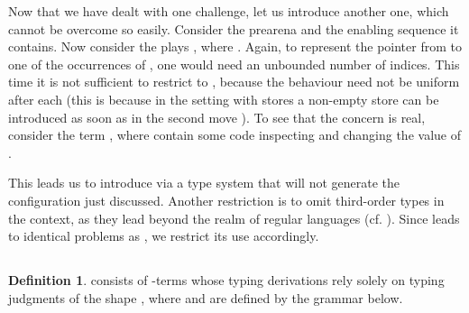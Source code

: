 \documentclass{CSML}
\theoremstyle{definition}\newtheorem{definition}[thm]{Definition}
\theoremstyle{definition}\newtheorem{example}[thm]{Example}
\theoremstyle{definition}\newtheorem{proposition}[thm]{Proposition}
\theoremstyle{definition}\newtheorem{lemma}[thm]{Lemma}
\theoremstyle{definition}\newtheorem{theorem}[thm]{Theorem}
\theoremstyle{definition}\newtheorem{corollary}[thm]{Corollary}
\theoremstyle{definition}\newtheorem{remark}[thm]{Remark}
\newcommand\nt[1]{#1}
\begin{document}
Now that we have dealt with one challenge, let us introduce another one, which
cannot be overcome so easily. Consider the \nt{prearena} 
 and the enabling 
sequence  it contains. Now
consider the plays , where . Again, to represent
the pointer from  to one of the  occurrences of , one would need an unbounded number of indices.
This time it is not sufficient to restrict  to , because the behaviour need not be uniform
after each  (this is because in the setting with stores a non-empty store
can be introduced as soon as in the second move ). To see that the concern is real,
consider the term 
,
where  contain some code inspecting and changing the value of .

This leads us to introduce  via a type system that will not generate the configuration
just discussed. Another restriction is to omit third-order types in the context, as
they lead beyond the realm of regular languages 
(cf. ).
Since  leads to identical problems as , we restrict its use
accordingly.

\subsection{\texorpdfstring{}{IA2+}}

\begin{definition}
 consists of -terms whose typing derivations rely solely on typing
judgments of the shape
,
where  and  are defined by the grammar below.

\end{definition}\medskip
\end{document}
